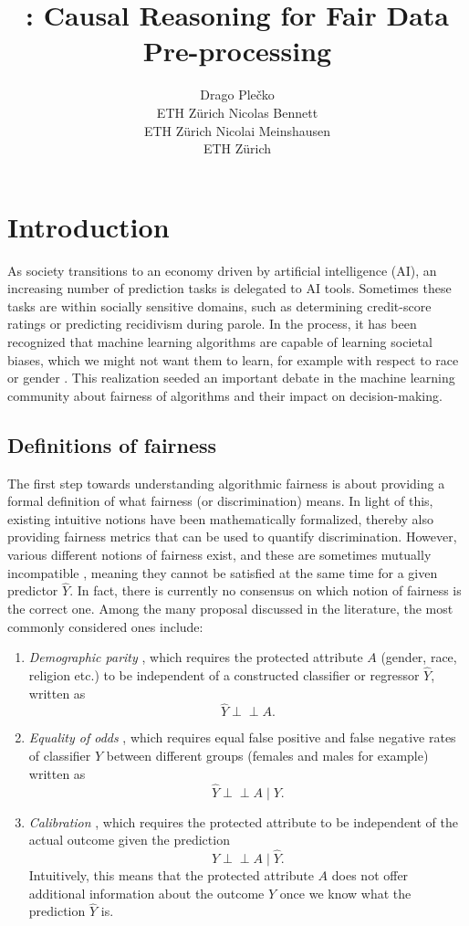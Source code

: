 \documentclass[
  nojss]{jss}
\author{
Drago Plečko\\ETH Zürich \And Nicolas Bennett\\ETH Zürich \And Nicolai Meinshausen\\ETH Zürich
}
\title{\pkg{fairadapt}: Causal Reasoning for Fair Data Pre-processing}
\providecommand{\tightlist}{%
  \setlength{\itemsep}{0pt}\setlength{\parskip}{0pt}}
\begin{document}
\hypertarget{introduction}{%
\section{Introduction}\label{introduction}}

As society transitions to an economy driven by artificial intelligence
(AI), an increasing number of prediction tasks is delegated to AI tools.
Sometimes these tasks are within socially sensitive domains, such as
determining credit-score ratings or predicting recidivism during parole.
In the process, it has been recognized that machine learning algorithms
are capable of learning societal biases, which we might not want them to
learn, for example with respect to race \citep{larson2016recidivism} or
gender \citep{lambrecht2019algorithmic, blau2003pay}. This realization
seeded an important debate in the machine learning community about
fairness of algorithms and their impact on decision-making.

\hypertarget{definitions-of-fairness}{%
\subsection{Definitions of fairness}\label{definitions-of-fairness}}

The first step towards understanding algorithmic fairness is about
providing a formal definition of what fairness (or discrimination)
means. In light of this, existing intuitive notions have been
mathematically formalized, thereby also providing fairness metrics that
can be used to quantify discrimination. However, various different
notions of fairness exist, and these are sometimes mutually incompatible
\citep{corbett2018measure}, meaning they cannot be satisfied at the same
time for a given predictor \(\widehat{Y}\). In fact, there is currently
no consensus on which notion of fairness is the correct one. Among the
many proposal discussed in the literature, the most commonly considered
ones include:

\begin{enumerate}
\def\labelenumi{(\arabic{enumi})}
\tightlist
\item
  \emph{Demographic parity} \citep{darlington1971fairness}, which
  requires the protected attribute \(A\) (gender, race, religion etc.)
  to be independent of a constructed classifier or regressor
  \(\widehat{Y}\), written as \[\widehat{Y} {\perp\!\!\!\perp}A.\]
\item
  \emph{Equality of odds} \citep{hardt2016eosl}, which requires equal
  false positive and false negative rates of classifier \(\widehat{Y}\)
  between different groups (females and males for example) written as
  \[\widehat{Y} {\perp\!\!\!\perp}A \mid Y.\]
\item
  \emph{Calibration} \citep{chouldechova2017fair}, which requires the
  protected attribute to be independent of the actual outcome given the
  prediction \[Y {\perp\!\!\!\perp}A \mid \widehat{Y}.\] Intuitively,
  this means that the protected attribute \(A\) does not offer
  additional information about the outcome \(Y\) once we know what the
  prediction \(\widehat{Y}\) is.
\end{enumerate}
\end{document}

